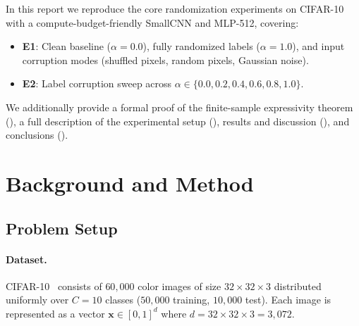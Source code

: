 \documentclass[12pt,a4paper]{article}
\newif\ifshowguides
\newcommand{\guide}[1]{%
  \ifshowguides
    \begin{tcolorbox}[colframe=blue!60,colback=blue!5,
                      title={\small\textbf{Instructor Guide}},
                      fonttitle=\small\bfseries]
      {\small\textit{Guide: }#1}
    \end{tcolorbox}
  \fi
}
\theoremstyle{definition}
\theoremstyle{remark}
\begin{document}
In this report we reproduce the core randomization experiments on
CIFAR-10~\cite{krizhevsky2009learning} with a compute-budget-friendly
SmallCNN and MLP-512, covering:
\begin{itemize}
  \item \textbf{E1}: Clean baseline ($\alpha = 0.0$), fully randomized labels
        ($\alpha = 1.0$), and input corruption modes (shuffled pixels, random
        pixels, Gaussian noise).
  \item \textbf{E2}: Label corruption sweep across
        $\alpha \in \{0.0, 0.2, 0.4, 0.6, 0.8, 1.0\}$.
\end{itemize}
We additionally provide a formal proof of the finite-sample expressivity
theorem (), a full description of the experimental
setup (), results and discussion (), and
conclusions ().

\section{Background and Method}
\label{sec:background}

\subsection{Problem Setup}
\label{sec:problem}

\guide{%
  Define the learning problem formally. Introduce the dataset, the
  corruption procedure, and the notation you will use throughout.
  Include any equations that make the setup precise.
}

\paragraph{Dataset.}
CIFAR-10~\cite{krizhevsky2009learning} consists of $60{,}000$ color images
of size $32 \times 32 \times 3$ distributed uniformly over $C = 10$ classes
($50{,}000$ training, $10{,}000$ test). Each image is represented as a vector
$\mathbf{x} \in [0,1]^d$ where $d = 32 \times 32 \times 3 = 3{,}072$.
\end{document}
